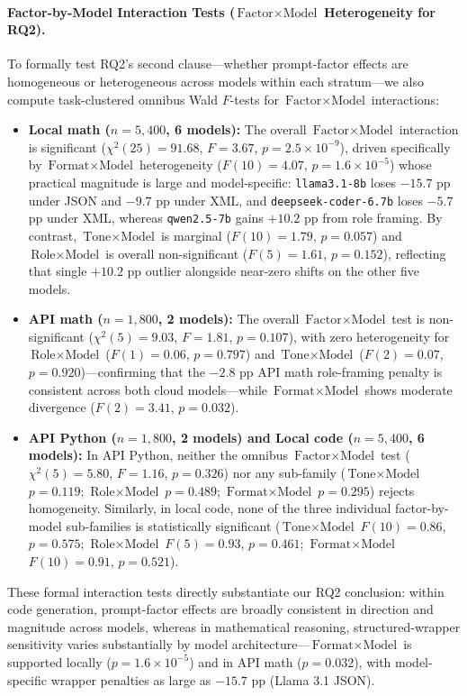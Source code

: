 \documentclass[a4paper,fleqn]{cas-sc}
\providecommand{\tightlist}{%
  \setlength{\itemsep}{0pt}\setlength{\parskip}{0pt}}
\begin{document}
\paragraph{Factor-by-Model Interaction Tests ($\text{Factor} \times \text{Model}$ Heterogeneity for RQ2).}
To formally test RQ2's second clause—whether prompt-factor effects are homogeneous or heterogeneous across models within each stratum—we also compute task-clustered omnibus Wald $F$-tests for $\text{Factor} \times \text{Model}$ interactions:
\begin{itemize}
\tightlist
\item \textbf{Local math ($n = 5,400$, 6 models):} The overall $\text{Factor} \times \text{Model}$ interaction is significant ($\chi^2(25) = 91.68$, $F = 3.67$, $p = 2.5 \times 10^{-9}$), driven specifically by $\text{Format} \times \text{Model}$ heterogeneity ($F(10) = 4.07$, $p = 1.6 \times 10^{-5}$) whose practical magnitude is large and model-specific: \texttt{llama3.1-8b} loses $-15.7$ pp under JSON and $-9.7$ pp under XML, and \texttt{deepseek-coder-6.7b} loses $-5.7$ pp under XML, whereas \texttt{qwen2.5-7b} gains $+10.2$ pp from role framing. By contrast, $\text{Tone} \times \text{Model}$ is marginal ($F(10) = 1.79$, $p = 0.057$) and $\text{Role} \times \text{Model}$ is overall non-significant ($F(5) = 1.61$, $p = 0.152$), reflecting that single $+10.2$ pp outlier alongside near-zero shifts on the other five models.
\item \textbf{API math ($n = 1,800$, 2 models):} The overall $\text{Factor} \times \text{Model}$ test is non-significant ($\chi^2(5) = 9.03$, $F = 1.81$, $p = 0.107$), with zero heterogeneity for $\text{Role} \times \text{Model}$ ($F(1) = 0.06$, $p = 0.797$) and $\text{Tone} \times \text{Model}$ ($F(2) = 0.07$, $p = 0.920$)—confirming that the $-2.8$ pp API math role-framing penalty is consistent across both cloud models—while $\text{Format} \times \text{Model}$ shows moderate divergence ($F(2) = 3.41$, $p = 0.032$).
\item \textbf{API Python ($n = 1,800$, 2 models) and Local code ($n = 5,400$, 6 models):} In API Python, neither the omnibus $\text{Factor} \times \text{Model}$ test ($\chi^2(5) = 5.80$, $F = 1.16$, $p = 0.326$) nor any sub-family ($\text{Tone} \times \text{Model}$ $p = 0.119$; $\text{Role} \times \text{Model}$ $p = 0.489$; $\text{Format} \times \text{Model}$ $p = 0.295$) rejects homogeneity. Similarly, in local code, none of the three individual factor-by-model sub-families is statistically significant ($\text{Tone} \times \text{Model}$ $F(10) = 0.86$, $p = 0.575$; $\text{Role} \times \text{Model}$ $F(5) = 0.93$, $p = 0.461$; $\text{Format} \times \text{Model}$ $F(10) = 0.91$, $p = 0.521$).
\end{itemize}
These formal interaction tests directly substantiate our RQ2 conclusion: within code generation, prompt-factor effects are broadly consistent in direction and magnitude across models, whereas in mathematical reasoning, structured-wrapper sensitivity varies substantially by model architecture—$\text{Format} \times \text{Model}$ is supported locally ($p = 1.6 \times 10^{-5}$) and in API math ($p = 0.032$), with model-specific wrapper penalties as large as $-15.7$ pp (Llama 3.1 JSON).
\end{document}
